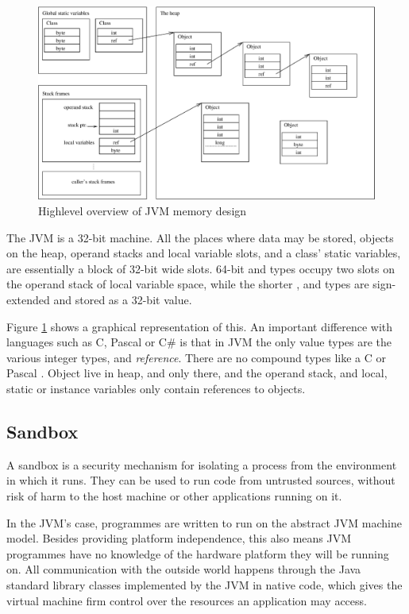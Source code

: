 \begin{figure}
\centering
\includegraphics[width=\linewidth]{jvmmemory.eps}
\caption{Highlevel overview of JVM memory design}
\label{fig-jvm-memory}
\end{figure}

The JVM is a 32-bit machine. All the places where data may be stored, objects on the heap, operand stacks and local variable slots, and a class' static variables, are essentially a block of 32-bit wide slots. 64-bit  and  types occupy two slots on the operand stack of local variable space, while the shorter , and  types are sign-extended and stored as a 32-bit value.
  
Figure \ref{fig-jvm-memory} shows a graphical representation of this. An important difference with languages such as C, Pascal or C\# is that in JVM the only value types are the various integer types, and \emph{reference}. There are no compound types like a C  or Pascal . Object live in heap, and only there, and the operand stack, and local, static or instance variables only contain references to objects.

\subsection{Sandbox}
A sandbox is a security mechanism for isolating a process from the environment in which it runs. They can be used to run code from untrusted sources, without risk of harm to the host machine or other applications running on it.

In the JVM's case, programmes are written to run on the abstract JVM machine model. Besides providing platform independence, this also means JVM programmes have no knowledge of the hardware platform they will be running on. All communication with the outside world happens through the Java standard library classes implemented by the JVM in native code, which gives the virtual machine firm control over the resources an application may access.

